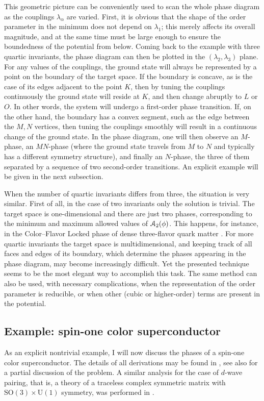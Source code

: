 \documentclass[final,2p,times,12pt,sort&compress]{elsarticle}
\newcommand\gr[1]{\mathrm{#1}}              %
\newcommand\AP{\EuScript{A}}                %
\begin{document}
This geometric picture can be conveniently used to scan the whole phase diagram
as the couplings $\lambda_\alpha$ are varied. First, it is obvious that the
shape of the order parameter in the minimum does not depend on $\lambda_1$;
this merely affects its overall magnitude, and at the same time must be large
enough to ensure the boundedness of the potential from below. Coming back to
the example with three quartic invariants, the phase diagram can then be
plotted in the $(\lambda_2,\lambda_3)$ plane. For any values of the couplings,
the ground state will always be represented by a point on the boundary of the
target space. If the boundary is concave, as is the case of its edges adjacent
to the point $K$, then by tuning the couplings continuously the ground state
will reside at $K$, and then change abruptly to $L$ or $O$. In other words, the
system will undergo a first-order phase transition. If, on the other hand, the
boundary has a convex segment, such as the edge between the $M,N$ vertices,
then tuning the couplings smoothly will result in a continuous change of the
ground state. In the phase diagram, one will then observe an $M$-phase, an
$MN$-phase (where the ground state travels from $M$ to $N$ and typically has a
different symmetry structure), and finally an $N$-phase, the three of them
separated by a sequence of two second-order transitions. An explicit example
will be given in the next subsection.

When the number of quartic invariants differs from three, the situation is very
similar. First of all, in the case of two invariants only the solution is
trivial. The target space is one-dimensional and there are just two phases,
corresponding to the minimum and maximum allowed values of $\AP_2(\phi)$. This
happens, for instance, in the Color--Flavor Locked phase of dense three-flavor
quark matter \cite{Iida:2000ha}. For more quartic invariants the target space
is multidimensional, and keeping track of all faces and edges of its boundary,
which determine the phases appearing in the phase diagram, may become
increasingly difficult. Yet the presented technique seems to be the most
elegant way to accomplish this task. The same method can also be used, with
necessary complications, when the representation of the order parameter is
reducible, or when other (cubic or higher-order) terms are present in the
potential.


\subsection{Example: spin-one color superconductor}
\label{subsec:spin1CSC}
As an explicit nontrivial example, I will now discuss the phases of a spin-one
color superconductor. The details of all derivations may be found in
\cite{Brauner:2008ma}, see also \cite{Bailin:1983bm,Schmitt:2004et}
for a partial discussion of the problem. A similar analysis for the case of
$d$-wave pairing, that is, a theory of a traceless complex symmetric matrix with
$\gr{SO(3)\times U(1)}$ symmetry, was performed in \cite{Mermin:1974me}.
\end{document}
